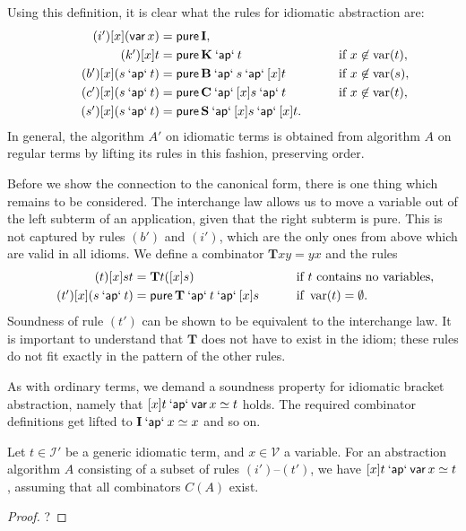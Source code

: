 Using this definition, it is clear what the rules for idiomatic abstraction
are:
\begin{alignat}{2}
	\tag{$i'$} [x](\operatorname{\mathsf{var}} x) &= \operatorname{\mathsf{pure}} \mathbf{I}, && \\
	\tag{$k'$} [x]t &= \operatorname{\mathsf{pure}} \mathbf{K} \mathbin{\mathsf{`ap`}} t &&\qquad\text{if } x \not\in \operatorname{var}(t), \\
	\tag{$b'$} [x](s \mathbin{\mathsf{`ap`}} t) &= \operatorname{\mathsf{pure}} \mathbf{B} \mathbin{\mathsf{`ap`}} s \mathbin{\mathsf{`ap`}} [x]t &&\qquad\text{if } x \not\in \operatorname{var}(s), \\
	\tag{$c'$} [x](s \mathbin{\mathsf{`ap`}} t) &= \operatorname{\mathsf{pure}} \mathbf{C} \mathbin{\mathsf{`ap`}} [x]s \mathbin{\mathsf{`ap`}} t &&\qquad\text{if } x \not\in \operatorname{var}(t), \\
	\tag{$s'$} [x](s \mathbin{\mathsf{`ap`}} t) &= \operatorname{\mathsf{pure}} \mathbf{S} \mathbin{\mathsf{`ap`}} [x]s \mathbin{\mathsf{`ap`}} [x]t. &&
\end{alignat}
In general, the algorithm $A'$ on idiomatic terms is obtained from algorithm
$A$ on regular terms by lifting its rules in this fashion, preserving order.

Before we show the connection to the canonical form, there is one thing which
remains to be considered.
The interchange law allows us to move a variable out of the left subterm of
an application, given that the right subterm is pure.
This is not captured by rules $(b')$ and $(i')$, which are the only ones from
above which are valid in all idioms.
We define a combinator $\mathbf{T}xy = yx$ and the rules
\begin{alignat}{2}
	\tag{$t$} [x]st &= \mathbf{T}t([x]s) &&\qquad\text{if $t$ contains no variables}, \\
	\tag{$t'$} [x](s \mathbin{\mathsf{`ap`}} t) &= \operatorname{\mathsf{pure}} \mathbf{T} \mathbin{\mathsf{`ap`}} t \mathbin{\mathsf{`ap`}} [x]s &&\qquad\text{if } \operatorname{var}(t) = \emptyset.
\end{alignat}
Soundness of rule $(t')$ can be shown to be equivalent to the interchange law.
It is important to understand that $\mathbf{T}$ does not have to exist in the
idiom; these rules do not fit exactly in the pattern of the other rules.

As with ordinary terms, we demand a soundness property for idiomatic bracket
abstraction, namely that $[x]t \mathbin{\mathsf{`ap`}} \operatorname{\mathsf{var}} x \simeq t$ holds.
The required combinator definitions get lifted to $\mathbf{I} \mathbin{\mathsf{`ap`}} x \simeq x$
and so on.
\begin{lemma}
Let $t \in \mathcal{I'}$ be a generic idiomatic term, and $x \in \mathcal{V}$
a variable.
For an abstraction algorithm $A$ consisting of a subset of rules $(i')$--$(t')$,
we have $[x]t \mathbin{\mathsf{`ap`}} \operatorname{\mathsf{var}} x \simeq t$, assuming that all combinators $C(A)$
exist.
\end{lemma}
\begin{proof}
\todo ?
\end{proof}

